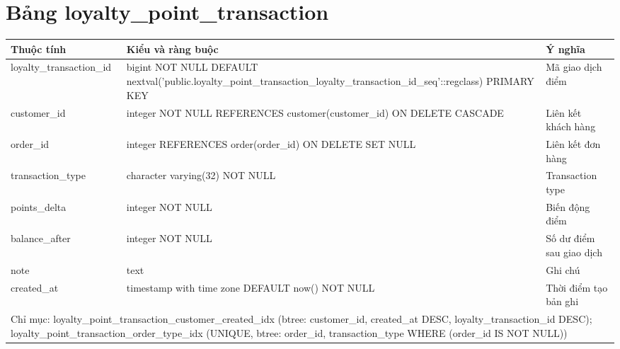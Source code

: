 \section{Bảng loyalty\_point\_transaction}
\begin{longtable}{|p{}|p{}|p{}|}\hline
\textbf{Thuộc tính}&\textbf{Kiểu và ràng buộc}&\textbf{Ý nghĩa}\\\hline\endhead
loyalty\_transaction\_id & bigint NOT NULL DEFAULT nextval('public.loyalty\_point\_transaction\_loyalty\_transaction\_id\_seq'::regclass) PRIMARY KEY & Mã giao dịch điểm\\\hline
customer\_id & integer NOT NULL REFERENCES customer(customer\_id) ON DELETE CASCADE & Liên kết khách hàng\\\hline
order\_id & integer REFERENCES order(order\_id) ON DELETE SET NULL & Liên kết đơn hàng\\\hline
transaction\_type & character varying(32) NOT NULL & Transaction type\\\hline
points\_delta & integer NOT NULL & Biến động điểm\\\hline
balance\_after & integer NOT NULL & Số dư điểm sau giao dịch\\\hline
note & text & Ghi chú\\\hline
created\_at & timestamp with time zone DEFAULT now() NOT NULL & Thời điểm tạo bản ghi\\\hline
\multicolumn{3}{|p{0.93\textwidth}|}{Chỉ mục: loyalty\_point\_transaction\_customer\_created\_idx (btree: customer\_id, created\_at DESC, loyalty\_transaction\_id DESC); loyalty\_point\_transaction\_order\_type\_idx (UNIQUE, btree: order\_id, transaction\_type WHERE (order\_id IS NOT NULL))}\\\hline
\end{longtable}
\normalsize
